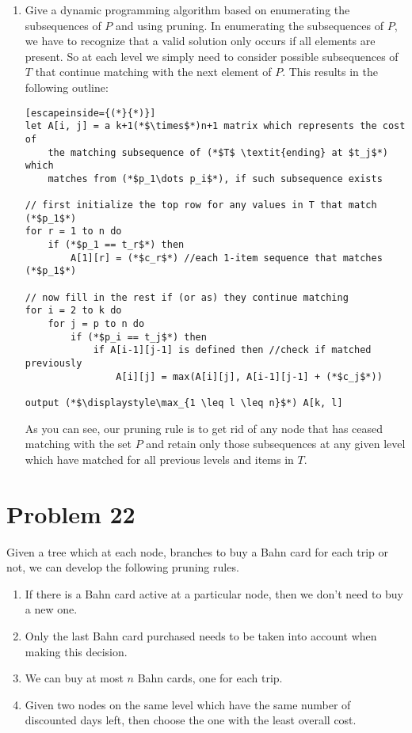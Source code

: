 \documentclass{article}
\providecommand{\prob}[1]{\section*{Problem #1}}
\begin{document}
\begin{enumerate}[label=(\alph*)]
        \item Give a dynamic programming algorithm based on enumerating the subsequences of $P$ and using pruning.
            In enumerating the subsequences of $P$, we have to recognize that a valid solution only occurs if all elements are present. So at each level we simply need to consider possible subsequences of $T$ that continue matching with the next element of $P$. This results in the following outline:

            \begin{lstlisting}[escapeinside={(*}{*)}]
let A[i, j] = a k+1(*$\times$*)n+1 matrix which represents the cost of
    the matching subsequence of (*$T$ \textit{ending} at $t_j$*) which
    matches from (*$p_1\dots p_i$*), if such subsequence exists

// first initialize the top row for any values in T that match (*$p_1$*)
for r = 1 to n do
    if (*$p_1 == t_r$*) then
        A[1][r] = (*$c_r$*) //each 1-item sequence that matches (*$p_1$*)

// now fill in the rest if (or as) they continue matching
for i = 2 to k do
    for j = p to n do
        if (*$p_i == t_j$*) then
            if A[i-1][j-1] is defined then //check if matched previously
                A[i][j] = max(A[i][j], A[i-1][j-1] + (*$c_j$*))

output (*$\displaystyle\max_{1 \leq l \leq n}$*) A[k, l]
            \end{lstlisting}

    As you can see, our pruning rule is to get rid of any node that has ceased matching with the set $P$ and retain only those subsequences at any given level which have matched for all previous levels and items in $T$.
    \end{enumerate}

    \prob{22}
    Given a tree which at each node, branches to buy a Bahn card for each trip or not, we can develop the following pruning rules.
    \begin{enumerate}
        \item If there is a Bahn card active at a particular node, then we don't need to buy a new one.
        \item Only the last Bahn card purchased needs to be taken into account when making this decision.
        \item We can buy at most $n$ Bahn cards, one for each trip.
        \item Given two nodes on the same level which have the same number of discounted days left, then choose the one with the least overall cost.
    \end{enumerate}
\end{document}
